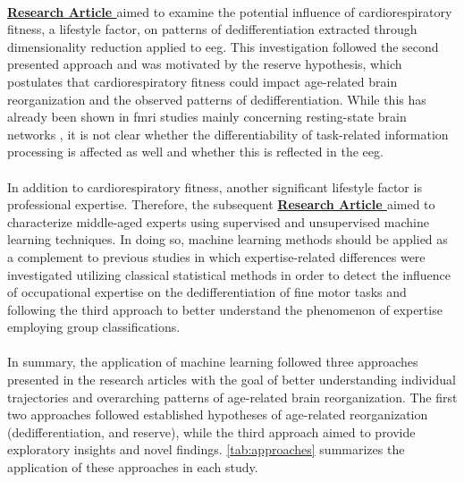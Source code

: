 \\
\textbf{\hyperref[pub:paperIII]{Research Article }} aimed to examine the potential influence of cardiorespiratory fitness, a lifestyle factor, on patterns of dedifferentiation extracted through dimensionality reduction applied to \gls{eeg}. This investigation followed the second presented approach and was motivated by the reserve hypothesis, which postulates that cardiorespiratory fitness could impact age-related brain reorganization and the observed patterns of dedifferentiation. While this has already been shown in \gls{fmri} studies mainly concerning resting-state brain networks \cite{Stillman2019}, it is not clear whether the differentiability of task-related information processing is affected as well and whether this is reflected in the \gls{eeg}.\\
\\
In addition to cardiorespiratory fitness, another significant lifestyle factor is professional expertise. Therefore, the subsequent \textbf{\hyperref[pub:paperIV]{Research Article }} aimed to characterize middle-aged experts using supervised and unsupervised machine learning techniques. In doing so, machine learning methods should be applied as a complement to previous studies in which expertise-related differences were investigated utilizing classical statistical methods \cite{Vieluf2018, Goelz2018} in order to detect the influence of occupational expertise on the dedifferentiation of fine motor tasks and following the third approach to better understand the phenomenon of expertise employing group classifications.\\
\\
In summary, the application of machine learning followed three approaches presented in the research articles with the goal of better understanding individual trajectories and overarching patterns of age-related brain reorganization. The first two approaches followed established hypotheses of age-related reorganization (dedifferentiation, and reserve), while the third approach aimed to provide exploratory insights and novel findings. \autoref{tab:approaches} summarizes the application of these approaches in each study.

